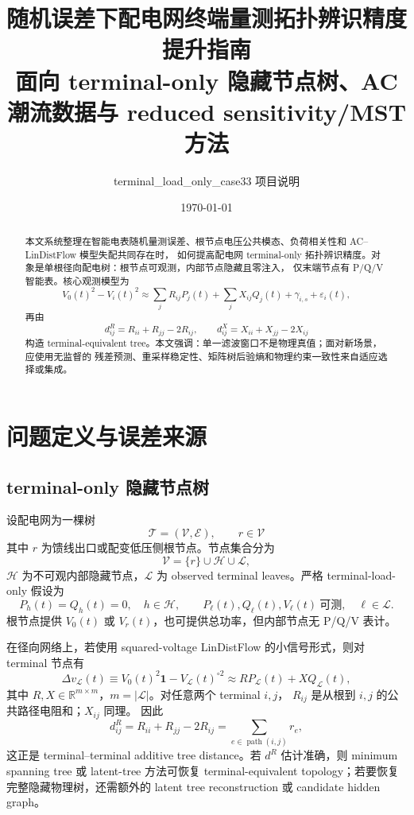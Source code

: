 \documentclass[UTF8,11pt]{ctexart}
\title{随机误差下配电网终端量测拓扑辨识精度提升指南\\
\large 面向 terminal-only 隐藏节点树、AC 潮流数据与 reduced sensitivity/MST 方法}
\author{terminal\_load\_only\_case33 项目说明}
\date{\today}
\newcommand{\R}{\mathbb{R}}
\begin{document}
\maketitle

\begin{abstract}
本文系统整理在智能电表随机量测误差、根节点电压公共模态、负荷相关性和 AC--LinDistFlow 模型失配共同存在时，
如何提高配电网 terminal-only 拓扑辨识精度。对象是单根径向配电树：根节点可观测，内部节点隐藏且零注入，
仅末端节点有 P/Q/V 智能表。核心观测模型为
\[
    V_0(t)^2 - V_i(t)^2
    \approx \sum_j R_{ij}P_j(t)+\sum_j X_{ij}Q_j(t)+\gamma_{i,s}+\varepsilon_i(t),
\]
再由
\[
    d^R_{ij}=R_{ii}+R_{jj}-2R_{ij},\qquad
    d^X_{ij}=X_{ii}+X_{jj}-2X_{ij}
\]
构造 terminal-equivalent tree。本文强调：单一滤波窗口不是物理真值；面对新场景，应使用无监督的
残差预测、重采样稳定性、矩阵树后验熵和物理约束一致性来自适应选择或集成。
\end{abstract}

\tableofcontents

\section{问题定义与误差来源}

\subsection{terminal-only 隐藏节点树}

设配电网为一棵树
\[
    \mathcal{T}=(\mathcal{V},\mathcal{E}),\qquad r\in\mathcal{V}
\]
其中 $r$ 为馈线出口或配变低压侧根节点。节点集合分为
\[
    \mathcal{V}=\{r\}\cup \mathcal{H}\cup \mathcal{L},
\]
$\mathcal{H}$ 为不可观内部隐藏节点，$\mathcal{L}$ 为 observed terminal leaves。严格 terminal-load-only 假设为
\[
    P_h(t)=Q_h(t)=0,\quad h\in\mathcal{H},\qquad
    P_\ell(t),Q_\ell(t),V_\ell(t)\ \text{可测},\quad \ell\in\mathcal{L}.
\]
根节点提供 $V_0(t)$ 或 $V_r(t)$，也可提供总功率，但内部节点无 P/Q/V 表计。

在径向网络上，若使用 squared-voltage LinDistFlow 的小信号形式，则对 terminal 节点有
\begin{equation}
    \Delta v_{\mathcal{L}}(t)
    \equiv V_0(t)^2\bm{1}-V_{\mathcal{L}}(t)^{\circ 2}
    \approx R P_{\mathcal{L}}(t)+X Q_{\mathcal{L}}(t),
    \label{eq:drop-model}
\end{equation}
其中 $R,X\in\R^{m\times m}$，$m=|\mathcal{L}|$。对任意两个 terminal $i,j$，
$R_{ij}$ 是从根到 $i,j$ 的公共路径电阻和；$X_{ij}$ 同理。
因此
\begin{equation}
    d^R_{ij}=R_{ii}+R_{jj}-2R_{ij}
    =\sum_{e\in\operatorname{path}(i,j)} r_e,
    \label{eq:additive-distance}
\end{equation}
这正是 terminal--terminal additive tree distance。若 $d^R$ 估计准确，则 minimum spanning tree 或 latent-tree
方法可恢复 terminal-equivalent topology；若要恢复完整隐藏物理树，还需额外的 latent tree reconstruction
或 candidate hidden graph。
\end{document}
